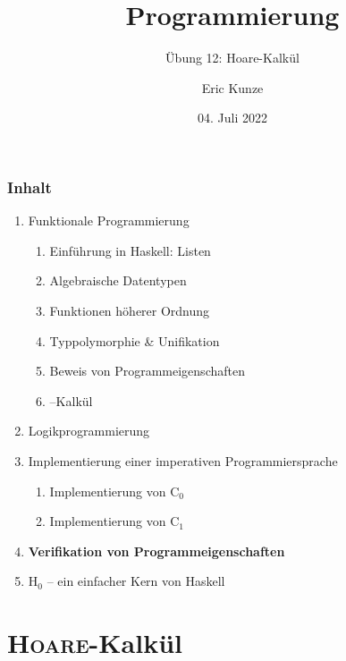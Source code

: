 \documentclass{beamer}
\begin{document}
	
	\title{Programmierung}
	\subtitle{Übung 12: Hoare-Kalkül}
	\author{Eric Kunze}
	\date{04. Juli 2022}
	
	\maketitle
	


\begin{frame}[fragile] \frametitle{Inhalt}
	\begin{enumerate}
		\item Funktionale Programmierung
		\begin{enumerate}
			\item Einführung in Haskell: Listen
			\item Algebraische Datentypen
			\item Funktionen höherer Ordnung
			\item Typpolymorphie \& Unifikation
			\item Beweis von Programmeigenschaften
			\item \textlambda--Kalkül
		\end{enumerate}
		\item Logikprogrammierung
		\item Implementierung einer imperativen Programmiersprache
		\begin{enumerate}
			\item Implementierung von C${}_\text{0}$
			\item Implementierung von C${}_\text{1}$
		\end{enumerate}
		\item \textbf{Verifikation von Programmeigenschaften}
		\item H${}_\text{0}$ -- ein einfacher Kern von Haskell
	\end{enumerate}
\end{frame}



\section{\textsc{Hoare}-Kalkül}
\end{document}
